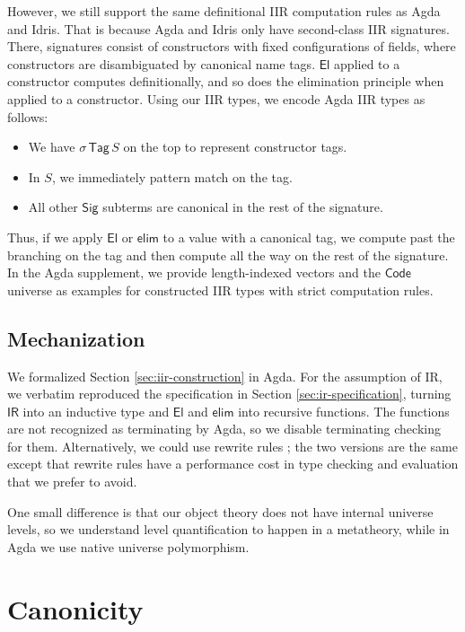 \documentclass[acmsmall,screen,review,anonymous]{acmart}
\newcommand{\msf}[1]{{\mathsf{#1}}}
\newcommand{\El}{\msf{El}}
\newcommand{\Sig}{\msf{Sig}}
\newcommand{\Code}{\msf{Code}}
\newcommand{\Tag}{\msf{Tag}}
\newcommand{\IR}{\msf{IR}}
\newcommand{\elim}{\msf{elim}}
\begin{document}
However, we still support the same definitional IIR computation rules as Agda and Idris. That is
because Agda and Idris only have second-class IIR signatures. There, signatures consist of
constructors with fixed configurations of fields, where constructors are disambiguated by canonical
name tags. $\El$ applied to a constructor computes definitionally, and so does the elimination
principle when applied to a constructor. Using our IIR types, we encode Agda IIR types as follows:
\begin{itemize}
\item We have $\sigma\,\Tag\,S$ on the top to represent constructor tags.
\item In $S$, we immediately pattern match on the tag.
\item All other $\Sig$ subterms are canonical in the rest of the signature.
\end{itemize}
Thus, if we apply $\El$ or $\elim$ to a value with a canonical tag, we compute past the branching on
the tag and then compute all the way on the rest of the signature. In the Agda supplement, we provide
length-indexed vectors and the $\Code$ universe as examples for constructed IIR types with strict
computation rules.

\subsection{Mechanization}

We formalized Section \ref{sec:iir-construction} in Agda. For the assumption of IR, we verbatim
reproduced the specification in Section \ref{sec:ir-specification}, turning $\IR$ into an inductive
type and $\El$ and $\elim$ into recursive functions. The functions are not recognized as terminating
by Agda, so we disable terminating checking for them. Alternatively, we could use rewrite rules
\cite{DBLP:journals/pacmpl/CockxTW21}; the two versions are the same except that rewrite rules have
a performance cost in type checking and evaluation that we prefer to avoid.

One small difference is that our object theory does not have internal universe levels, so we
understand level quantification to happen in a metatheory, while in Agda we use native universe
polymorphism.

\section{Canonicity}\label{sec:canonicity}
\end{document}
